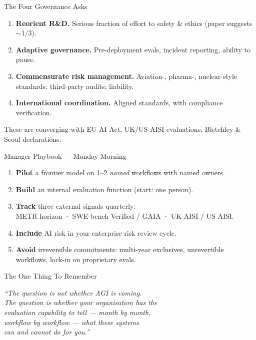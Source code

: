 \documentclass[aspectratio=169, 12pt, xcolor={dvipsnames,table}]{beamer}
\newcommand{\bigquote}[1]{%
  \begin{center}
    \large\itshape ``#1''
  \end{center}
}
\begin{document}
\begin{frame}{The Four Governance Asks}
\begin{enumerate}
  \item \textbf{Reorient R\&D.} Serious fraction of effort to safety
        \& ethics (paper suggests $\sim$1/3).
  \item \textbf{Adaptive governance.} Pre-deployment evals, incident
        reporting, ability to pause.
  \item \textbf{Commensurate risk management.} Aviation-, pharma-,
        nuclear-style standards; third-party audits; liability.
  \item \textbf{International coordination.} Aligned standards, with
        compliance verification.
\end{enumerate}
\vspace{0.4em}
\alert{These are converging with EU AI Act, UK/US AISI evaluations,
Bletchley \& Seoul declarations.}
\end{frame}

\begin{frame}{Manager Playbook --- Monday Morning}
\begin{enumerate}
  \item \textbf{Pilot} a frontier model on 1--2 \emph{named} workflows with named owners.
  \item \textbf{Build} an internal evaluation function (start: one person).
  \item \textbf{Track} three external signals quarterly:\\
        \quad METR horizon \quad · \quad SWE-bench Verified / GAIA \quad · \quad UK AISI / US AISI.
  \item \textbf{Include} AI risk in your enterprise risk review cycle.
  \item \textbf{Avoid} irreversible commitments: multi-year exclusives, unrevertible workflows, lock-in on proprietary evals.
\end{enumerate}
\end{frame}

\begin{frame}{The One Thing To Remember}
\bigquote{The question is not whether AGI is coming.\\[0.3em]
The question is whether your organisation has the \\[0.2em]
\alert{evaluation capability} to tell --- month by month, \\[0.2em]
workflow by workflow --- what these systems\\[0.2em]
can and cannot do for you.}
\end{frame}
\end{document}
